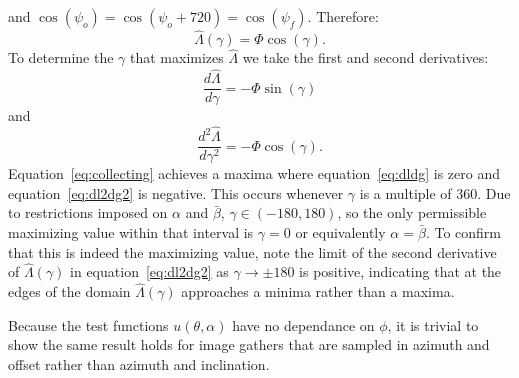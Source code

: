 and $\cos(\psi_o) = \cos(\psi_o + 720) =\cos(\psi_f)$.  Therefore:
\begin{equation}
\label{eq:collecting}
\hat{\Lambda}(\gamma) = \Phi \cos(\gamma). 
\end{equation}
To determine the $\gamma$ that maximizes $\hat{\Lambda}$ we take the first and second derivatives:
\begin{equation}
\label{eq:dldg}
\frac{d \hat{\Lambda}}{d\gamma} = - \Phi \sin \left(\gamma \right)
\end{equation}
and
\begin{equation}
\label{eq:dl2dg2}
\frac{d^2 \hat{\Lambda}}{d\gamma^2} = - \Phi \cos\left(\gamma \right).
\end{equation}
Equation~\ref{eq:collecting} achieves a maxima where equation~\ref{eq:dldg} is zero and equation~\ref{eq:dl2dg2} is negative.  This occurs whenever $\gamma$ is a multiple of $360$.  Due to restrictions imposed on $\alpha$ and $\bar{\beta}$, $\gamma \in \left(-180,180 \right)$, so the only permissible maximizing value within that interval is $\gamma = 0$ or equivalently $\alpha = \bar{\beta}$.  To confirm that this is indeed the maximizing value, note the limit of the second derivative of $\hat{\Lambda}(\gamma)$ in equation~\ref{eq:dl2dg2} as $\gamma \rightarrow \pm 180$ is positive, indicating that at the edges of the domain $\hat{\Lambda}(\gamma)$ approaches a minima rather than a maxima.

Because the test functions $u(\theta,\alpha)$ have no dependance on $\phi$, it is trivial to show the same result holds for image gathers that are sampled in azimuth and offset rather than azimuth and inclination.

